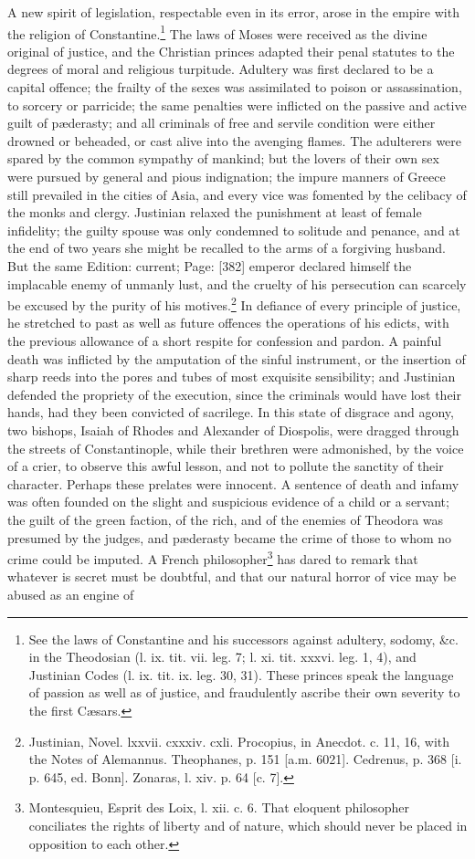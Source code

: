 A new spirit of legislation, respectable even in its error, arose in the empire with the religion of Constantine.\footnote{See the laws of Constantine and his successors against adultery, sodomy, \&c. in the Theodosian (l. ix. tit. vii. leg. 7; l. xi. tit. xxxvi. leg. 1, 4), and Justinian Codes (l. ix. tit. ix. leg. 30, 31). These princes speak the language of passion as well as of justice, and fraudulently ascribe their own severity to the first Cæsars.} The laws of Moses were received as the divine original of justice, and the Christian princes adapted their penal statutes to the degrees of moral and religious turpitude. Adultery was first declared to be a capital offence; the frailty of the sexes was assimilated to poison or assassination, to sorcery or parricide; the same penalties were inflicted on the passive and active guilt of pæderasty; and all criminals of free and servile condition were either drowned or beheaded, or cast alive into the avenging flames. The adulterers were spared by the common sympathy of mankind; but the lovers of their own sex were pursued by general and pious indignation; the impure manners of Greece still prevailed in the cities of Asia, and every vice was fomented by the celibacy of the monks and clergy. Justinian relaxed the punishment at least of female infidelity; the guilty spouse was only condemned to solitude and penance, and at the end of two years she might be recalled to the arms of a forgiving husband. But the same Edition: current; Page: [382] emperor declared himself the implacable enemy of unmanly lust, and the cruelty of his persecution can scarcely be excused by the purity of his motives.\footnote{Justinian, Novel. lxxvii. cxxxiv. cxli. Procopius, in Anecdot. c. 11, 16, with the Notes of Alemannus. Theophanes, p. 151 [a.m. 6021]. Cedrenus, p. 368 [i. p. 645, ed. Bonn]. Zonaras, l. xiv. p. 64 [c. 7].} In defiance of every principle of justice, he stretched to past as well as future offences the operations of his edicts, with the previous allowance of a short respite for confession and pardon. A painful death was inflicted by the amputation of the sinful instrument, or the insertion of sharp reeds into the pores and tubes of most exquisite sensibility; and Justinian defended the propriety of the execution, since the criminals would have lost their hands, had they been convicted of sacrilege. In this state of disgrace and agony, two bishops, Isaiah of Rhodes and Alexander of Diospolis, were dragged through the streets of Constantinople, while their brethren were admonished, by the voice of a crier, to observe this awful lesson, and not to pollute the sanctity of their character. Perhaps these prelates were innocent. A sentence of death and infamy was often founded on the slight and suspicious evidence of a child or a servant; the guilt of the green faction, of the rich, and of the enemies of Theodora was presumed by the judges, and pæderasty became the crime of those to whom no crime could be imputed. A French philosopher\footnote{Montesquieu, Esprit des Loix, l. xii. c. 6. That eloquent philosopher conciliates the rights of liberty and of nature, which should never be placed in opposition to each other.} has dared to remark that whatever is secret must be doubtful, and that our natural horror of vice may be abused as an engine of 